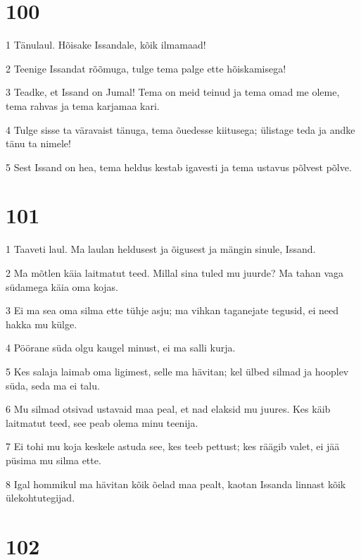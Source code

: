 \chapter{100}

\par 1 Tänulaul. Hõisake Issandale, kõik ilmamaad!
\par 2 Teenige Issandat rõõmuga, tulge tema palge ette hõiskamisega!
\par 3 Teadke, et Issand on Jumal! Tema on meid teinud ja tema omad me oleme, tema rahvas ja tema karjamaa kari.
\par 4 Tulge sisse ta väravaist tänuga, tema õuedesse kiitusega; ülistage teda ja andke tänu ta nimele!
\par 5 Sest Issand on hea, tema heldus kestab igavesti ja tema ustavus põlvest põlve.

\chapter{101}

\par 1 Taaveti laul. Ma laulan heldusest ja õigusest ja mängin sinule, Issand.
\par 2 Ma mõtlen käia laitmatut teed. Millal sina tuled mu juurde? Ma tahan vaga südamega käia oma kojas.
\par 3 Ei ma sea oma silma ette tühje asju; ma vihkan taganejate tegusid, ei need hakka mu külge.
\par 4 Pöörane süda olgu kaugel minust, ei ma salli kurja.
\par 5 Kes salaja laimab oma ligimest, selle ma hävitan; kel ülbed silmad ja hooplev süda, seda ma ei talu.
\par 6 Mu silmad otsivad ustavaid maa peal, et nad elaksid mu juures. Kes käib laitmatut teed, see peab olema minu teenija.
\par 7 Ei tohi mu koja keskele astuda see, kes teeb pettust; kes räägib valet, ei jää püsima mu silma ette.
\par 8 Igal hommikul ma hävitan kõik õelad maa pealt, kaotan Issanda linnast kõik ülekohtutegijad.

\chapter{102}

